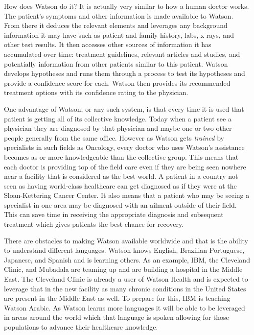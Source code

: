 \documentclass[sigconf]{acmart}
\begin{document}
How does Watson do it?  It is actually very similar to how a human doctor 
works.  The patient's symptoms and other information is made available to 
Watson.  From there it deduces the relevant elements and leverages any 
background information it may have such as patient and family history, 
labs, x-rays, and other test results.  It then accesses other sources of 
information it has accumulated over time: treatment guidelines, relevant 
articles and studies, and potentially information from other patients 
similar to this patient.  Watson develops hypotheses and runs them through 
a process to test its hypotheses and provide a confidence score for each.  
Watson then provides its recommended treatment options with its confidence 
rating to the physician\cite{BusInsider}.

One advantage of Watson, or any such system, is that every time it is used 
that patient is getting all of its collective knowledge.  Today when a 
patient see a physician they are diagnosed by that physician and maybe 
one or two other people generally from the same office.  However as Watson 
gets \emph{trained} by specialists in such fields as Oncology, every doctor 
who uses Watson's assistance becomes as or more knowledgeable than the 
collective group.  This means that each doctor is providing top of the 
field care even if they are being seen nowhere near a facility that is 
considered as the best world\cite{FortuneTrans}.  A patient in a country 
not seen as having world-class healthcare can get diagnosed as if they were 
at the Sloan-Kettering Cancer Center.  It also means that a patient who may 
be seeing a specialist in one area may be diagnosed with an ailment outside 
of their field.  This can save time in receiving the appropriate diagnosis 
and subsequent treatment which gives patients the best chance for recovery.

There are obstacles to making Watson available worldwide and that is the 
ability to understand different languages.  Watson knows English, Brazilian 
Portuguese, Japanese, and Spanish and is learning others.  As an example, 
IBM, the Cleveland Clinic, and Mubadala are teaming up and are building a 
hospital in the Middle East.  The Cleveland Clinic is already a user of 
Watson Health and is expected to leverage that in the new facility as many 
chronic conditions in the United States are present in the Middle East as 
well.  To prepare for this, IBM is teaching Watson 
Arabic\cite{FortuneArabic}.  As Watson learns more languages it will be able 
to be leveraged in areas around the world which that language is spoken 
allowing for those populations to advance their healthcare knowledge.
\end{document}
